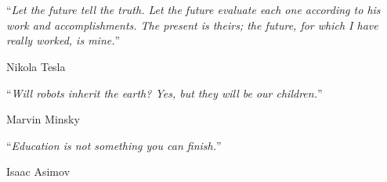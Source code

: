 \chapter*{}

\vspace*{0.1\textheight}

\hfill\noindent\enquote{\itshape Let the future tell the truth. Let the future evaluate each one according to his work and accomplishments. The present is theirs; the future, for which I have really worked, is mine.}\bigbreak

\hfill Nikola Tesla

\vspace*{0.05\textheight}

\hfill\noindent\enquote{\itshape Will robots inherit the earth? Yes, but they will be our children.}\bigbreak

\hfill Marvin Minsky

\vspace*{0.05\textheight}

\hfill\noindent\enquote{\itshape Education is not something you can finish.}\bigbreak

\hfill Isaac Asimov


